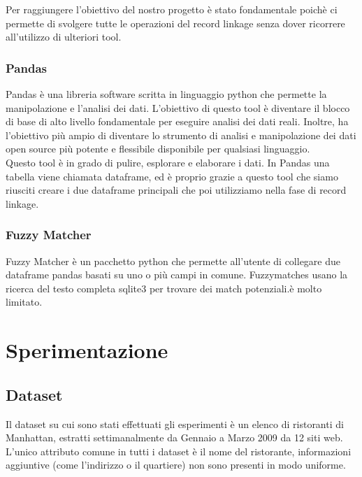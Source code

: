 \documentclass[a4paper,12pt]{article}
\begin{document}
Per raggiungere l'obiettivo del nostro progetto è stato fondamentale poichè ci permette di svolgere tutte le operazioni del record linkage senza dover ricorrere all'utilizzo di ulteriori tool.

\subsubsection{Pandas}
Pandas è una libreria software scritta in linguaggio python che permette la manipolazione e l'analisi dei dati. L'obiettivo di questo tool è diventare il blocco di base di alto livello fondamentale per eseguire analisi dei dati reali. Inoltre, ha l'obiettivo più ampio di diventare lo strumento di analisi e manipolazione dei dati open source più potente e flessibile disponibile per qualsiasi linguaggio.\\
Questo tool è in grado di pulire, esplorare e elaborare i dati. In Pandas una tabella viene chiamata dataframe, ed è proprio grazie a questo tool che siamo riusciti  creare i due dataframe principali che poi utilizziamo nella fase di record linkage.

\subsubsection{Fuzzy Matcher}
Fuzzy Matcher è un pacchetto python che permette all'utente di collegare due dataframe pandas basati su uno o più campi in comune. Fuzzymatches usano la ricerca del testo completa sqlite3 per trovare dei match potenziali.è molto limitato.

\newpage
\section{Sperimentazione}

\subsection{Dataset}
Il dataset su cui sono stati effettuati gli esperimenti è un elenco di ristoranti di Manhattan, estratti settimanalmente da Gennaio a Marzo 2009 da 12 siti web. L'unico attributo comune in tutti i dataset è il nome del ristorante, informazioni aggiuntive (come l'indirizzo o il quartiere) non sono presenti in modo uniforme.
\end{document}

